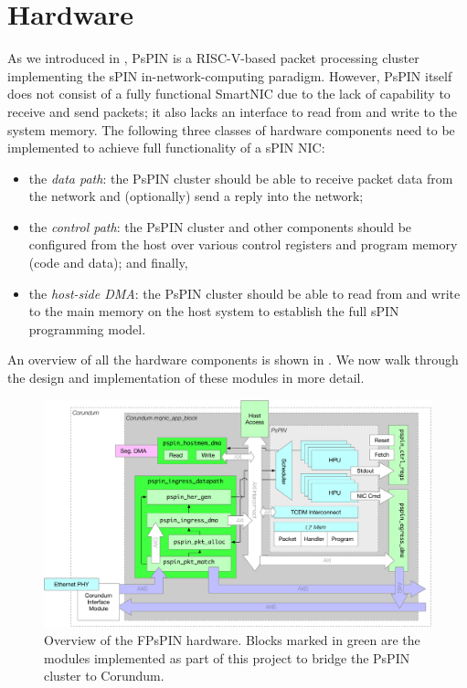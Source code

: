 \chapter{Hardware}

As we introduced in , PsPIN is a RISC-V-based packet processing cluster implementing the sPIN in-network-computing paradigm.  However, PsPIN itself does not consist of a fully functional SmartNIC due to the lack of capability to receive and send packets; it also lacks an interface to read from and write to the system memory.  The following three classes of hardware components need to be implemented to achieve full functionality of a sPIN NIC: 

\begin{itemize}
    \item the \emph{data path}: the PsPIN cluster should be able to receive packet data from the network and (optionally) send a reply into the network;
    \item the \emph{control path}: the PsPIN cluster and other components should be configured from the host over various control registers and program memory (code and data); and finally,
    \item the \emph{host-side DMA}: the PsPIN cluster should be able to read from and write to the main memory on the host system to establish the full sPIN programming model.
\end{itemize}

An overview of all the hardware components is shown in .  We now walk through the design and implementation of these modules in more detail.

\begin{figure}
    \centering
    \includegraphics[width=\linewidth]{figures/hw-overview.pdf}
    \caption{Overview of the FPsPIN hardware.  Blocks marked in green are the modules implemented as part of this project to bridge the PsPIN cluster to Corundum.}
    \label{fig:hw-overview}
\end{figure}

